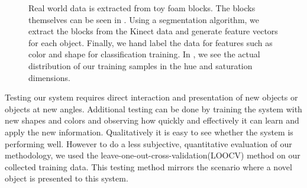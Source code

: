 \documentclass[11pt]{article}
\begin{document}
\begin{figure}[h!]
\centering
{}
\caption{Real world data is extracted from toy foam blocks. The blocks
    themselves can be seen in . Using a segmentation
    algorithm, we extract the blocks from the Kinect data 
    and generate feature vectors for each object.
    Finally, we hand label the data for features such as color and shape for
    classification training. In , we see the actual
    distribution of our training samples in the hue and saturation
    dimensions.}
\label{fig:objects}
\end{figure}





Testing our system requires direct interaction and presentation of new objects
or objects at new angles.  Additional testing can be done by training the
system with new shapes and colors and observing how quickly and effectively it
can learn and apply the new information.  Qualitatively it is easy to see
whether the system is performing well.  However to do a less subjective,
quantitative evaluation of our methodology, we used the
leave-one-out-cross-validation(LOOCV) method on our collected training data. This testing
method mirrors the
scenario where a novel object is presented to this system.
\end{document}
